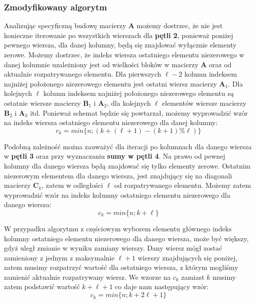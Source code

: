 \documentclass[12pt]{article}
\begin{document}
\subsubsection*{Zmodyfikowany algorytm}
Analizując specyficzną budowę macierzy $\textbf{A}$ możemy dostrzec, że nie jest konieczne iterowanie po wszystkich wierszach dla \textbf{pętli 2}, ponieważ poniżej pewnego wiersza, dla danej kolumny, będą się znajdować wyłącznie elementy zerowe. Możemy dostrzec, że indeks wiersza ostatniego elementu niezerowego w danej kolumnie uzależniony jest od wielkości bloków w macierzy $\textbf{A}$ oraz od aktualnie rozpatrywanego elementu. Dla pierwszych $\ell - 2$ kolumn indeksem najniżej położonego niezerowego elementu jest ostatni wiersz macierzy $\textbf{A}_1$. Dla kolejnych $\ell$ kolumn indeksem najniżej położonego niezerowego elementu są ostatnie wiersze macierzy $\textbf{B}_1$ i $\textbf{A}_2$, dla kolejnych $\ell$ elementów wiersze macierzy $\textbf{B}_2$ i $\textbf{A}_3$ itd. Ponieważ schemat będzie się powtarzał, możemy wyprowadzić wzór na indeks wiersza ostatniego elementu niezerowego dla danej kolumny:
\begin{equation}
	r_k = min\{n; (k+(\ell+1)-(k+1)\%\ell)\}
\end{equation}

Podobną zależność można zauważyć dla iteracji po kolumnach dla danego wiersza w \textbf{pętli 3} oraz przy wyznaczaniu \textbf{sumy w pętli 4}. Na prawo od pewnej kolumny dla danego wiersza będą znajdować się tylko elementy zerowe. Ostatnim niezerowym elementem dla danego wiersza, jest znajdujący się na diagonali macierzy $\textbf{C}_k$, zatem w odległości $\ell$ od rozpatrywanego elementu. Możemy zatem wyprowadzić wzór na indeks kolumny ostatniego elementu niezerowego dla danego wiersza:
\begin{equation}
	c_k = min\{n; k + \ell\}
\end{equation}

W przypadku algorytmu z częściowym wyborem elementu głównego indeks kolumny ostatniego elementu niezerowego dla danego wiersza, może być większy, gdyż uległ zmianie w wyniku zamiany wierszy. Dany wiersz mógł zostać zamieniony z jednym z maksymalnie $\ell + 1$ wierszy znajdujących się poniżej, zatem musimy rozpatrzyć wartość dla ostatniego wiersza, z którym mogliśmy zamienić aktualnie rozpatrywany wiersz. We wzorze na $c_k$ zamiast $k$ musimy zatem podstawić wartość $k + \ell + 1$ co daje nam następujący wzór:
\begin{equation}
	c_k = min\{n; k + 2\ell + 1\}
\end{equation}
\end{document}
